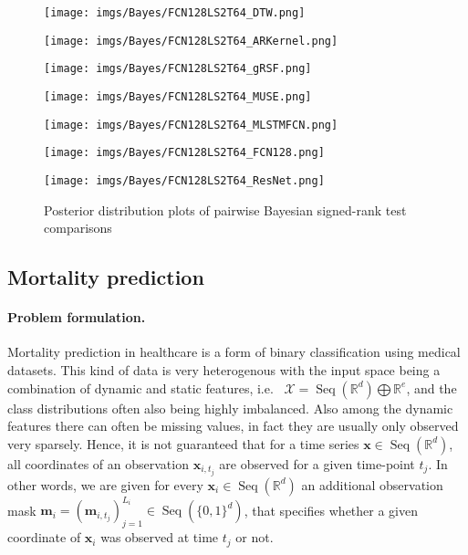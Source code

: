 \documentclass{article} \usepackage{iclr2021_conference,times}
\newcommand{\R}{\mathbb{R}}
\newcommand{\bx}{\mathbf{x}}
\newcommand{\m}{\mathbf{m}}
\newcommand{\cX}{\mathcal{X}}
\newcommand{\Seq}[1]{\operatorname{Seq}(#1)}
\theoremstyle{plain}
\theoremstyle{definition}
\begin{document}
\begin{figure}
	\begin{minipage}{0.245\textwidth}
		\centering
\texttt{[image: imgs/Bayes/FCN128LS2T64\_DTW.png]}
\end{minipage}
\begin{minipage}{0.245\textwidth}
		\centering
\texttt{[image: imgs/Bayes/FCN128LS2T64\_ARKernel.png]}
\end{minipage}
	\begin{minipage}{0.245\textwidth}
		\centering
\texttt{[image: imgs/Bayes/FCN128LS2T64\_gRSF.png]}
\end{minipage}
\begin{minipage}{0.245\textwidth}
		\centering
\texttt{[image: imgs/Bayes/FCN128LS2T64\_MUSE.png]}
\end{minipage}
\begin{minipage}{0.245\textwidth}
		\centering
\texttt{[image: imgs/Bayes/FCN128LS2T64\_MLSTMFCN.png]}
\end{minipage}
	\begin{minipage}{0.245\textwidth}
		\centering
\texttt{[image: imgs/Bayes/FCN128LS2T64\_FCN128.png]}
\end{minipage}
	\begin{minipage}{0.245\textwidth}
		\centering
\texttt{[image: imgs/Bayes/FCN128LS2T64\_ResNet.png]}
\end{minipage}
	\caption{Posterior distribution plots of pairwise Bayesian signed-rank test comparisons}
	\label{fig:baycomp1}
\end{figure}

\clearpage

\subsection{Mortality prediction} \label{app:mortality}

\paragraph{Problem formulation.} Mortality prediction in healthcare is a form of binary classification using medical datasets.  This kind of data is very heterogenous with the input space being a combination of dynamic and static features, i.e.~ $\cX = \Seq{\R^d} \bigoplus \R^e$, and the class distributions often also being highly imbalanced. Also among the dynamic features there can often be missing values, in fact they are usually only observed very sparsely. Hence, it is not guaranteed that for a time series $\bx \in \Seq{\R^d}$, all coordinates of an observation $\bx_{i, t_j}$ are observed for a given time-point $t_j$. In other words, we are given for every $\bx_i \in \Seq{\R^d}$ an additional observation mask $\m_i = (\m_{i, t_j})_{j=1}^{L_i} \in \Seq{\{0, 1\}^d}$, that specifies whether a given coordinate of $\bx_i$ was observed at time $t_j$ or not.
\end{document}

